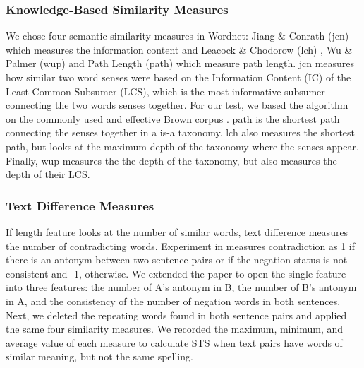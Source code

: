 \documentclass{article} %
\begin{document}
\subsubsection{Knowledge-Based Similarity Measures}
We chose four semantic similarity measures in Wordnet: Jiang \& Conrath (jcn) \cite{jcn} which measures the information content and Leacock \& Chodorow (lch) \cite{lch}, Wu \& Palmer (wup) \cite{wup} and Path Length (path) \cite{path} which measure path length. jcn measures how similar two word senses were based on the Information Content (IC) of the Least Common Subsumer (LCS), which is the most informative subsumer connecting the two words senses together. For our test, we based the algorithm on the commonly used and effective Brown corpus \cite{liu}. path is the shortest path connecting the senses together in a is-a taxonomy. lch also measures the shortest path, but looks at the maximum depth of the taxonomy where the senses appear. Finally, wup measures the the depth of the taxonomy, but also measures the depth of their LCS. 

\subsubsection{Text Difference Measures}
If length feature looks at the number of similar words, text difference measures the number of contradicting words. Experiment in \cite{ecnu} measures contradiction as 1 if there is an antonym between two sentence pairs or if the negation status is not consistent and -1, otherwise. We extended the paper to open the single feature into three features: the number of A's antonym in B, the number of B's antonym in A, and the consistency of the number of negation words in both sentences. Next, we deleted the repeating words found in both sentence pairs and applied the same four similarity measures. We recorded the maximum, minimum, and average value of each measure to calculate STS when text pairs have words of similar meaning, but not the same spelling.
\end{document}
